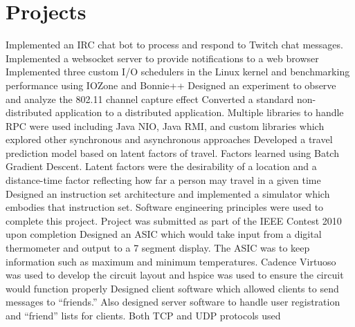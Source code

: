 \section{Projects}
		{\newline Implemented an IRC chat bot to process and respond to Twitch chat messages. Implemented a websocket server
		to provide notifications to a web browser}
		{}{}
		{\newline Implemented three custom I/O schedulers in the Linux kernel and benchmarking performance using IOZone and Bonnie++}
		{}{}
		{\newline Designed an experiment to observe and analyze the 802.11 channel capture effect}
		{}{}
		{\newline Converted a standard non-distributed application to a distributed application. Multiple libraries to handle
		RPC were used including Java NIO, Java RMI, and custom libraries which explored other synchronous
		and asynchronous approaches}
		{}{}
		{\newline Developed a travel prediction model based on latent factors of travel. Factors learned using Batch
		Gradient Descent. Latent factors were the desirability of a location and a distance-time factor reflecting
		how far a person may travel in a given time}
		{}{}
		{\newline Designed an instruction set architecture and implemented a simulator which embodies that instruction set.
		Software engineering principles were used to complete this project. Project was submitted as part of the
		IEEE Contest 2010 upon completion}
		{}{}
		{\newline Designed an ASIC which would take input from a digital thermometer and output to a 7 segment display.
		The ASIC was to keep information such as maximum and minimum temperatures. Cadence Virtuoso was
		used to develop the circuit layout and hspice was used to ensure the circuit would function properly}
		{}{}
		{\newline Designed client software which allowed clients to send messages to “friends.” Also designed server
		software to handle user registration and “friend” lists for clients. Both TCP and UDP protocols used}
		{}{}